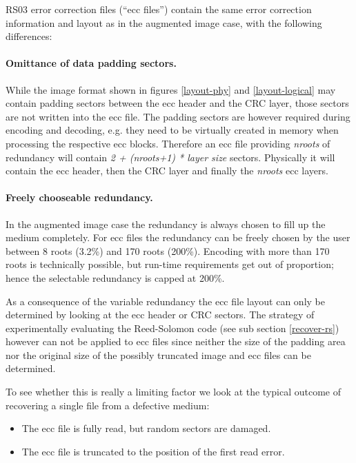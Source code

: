 \medskip

RS03 error correction files (``ecc files'')
contain the same error correction information
and layout as in the augmented image case, with the following differences:

\paragraph{Omittance of data padding sectors.} While the image format
shown in figures \ref{layout-phy} and \ref{layout-logical}
 may contain padding sectors between the ecc header and the CRC layer,
those sectors are not written into the ecc file.
The padding sectors are however required during encoding and
decoding, e.g. they need to be virtually created in memory 
when processing the respective ecc blocks. 
Therefore an ecc file providing {\em nroots} of redundancy
will contain {\em 2 + (nroots+1) * layer size} sectors.
Physically it will contain the ecc header, then the CRC layer 
and finally the {\em nroots} ecc layers.

\paragraph{Freely chooseable redundancy.} In the augmented image case
the redundancy is always chosen to fill up the medium completely.
For ecc files the redundancy can be freely chosen by the user between
 8 roots (3.2\%) and 170 roots (200\%). Encoding with more than 170 roots
is technically possible, but run-time requirements get out of proportion;
hence the selectable redundancy is capped at 200\%.

\medskip

As a consequence of the variable redundancy the ecc file layout can only
be determined by looking at the ecc header or CRC sectors. The strategy
of experimentally evaluating the Reed-Solomon code (see sub 
section \ref{recover-rs}) however can not be applied to ecc files since
neither the size of the padding area nor the original size of the 
possibly truncated image and ecc files can be determined. \medskip

To see whether this is really a limiting factor we look
at the typical outcome of recovering a single file from a defective
medium:

\begin{itemize}
\item The ecc file is fully read, but random sectors are damaged.
\item The ecc file is truncated to the position of the first read error.
\end{itemize}


